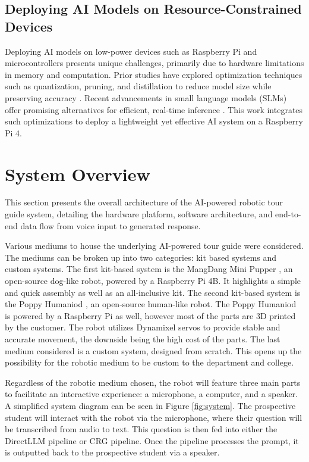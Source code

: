 \documentclass[conference]{IEEEtran}
\begin{document}
\subsection{Deploying AI Models on Resource-Constrained Devices}
Deploying AI models on low-power devices such as Raspberry Pi and microcontrollers presents unique challenges, primarily due to hardware limitations in memory and computation. 
Prior studies have explored optimization techniques such as quantization, pruning, and distillation to reduce model size while preserving accuracy \cite{b4}. 
Recent advancements in small language models (SLMs) offer promising alternatives for efficient, real-time inference \cite{b5}. 
This work integrates such optimizations to deploy a lightweight yet effective AI system on a Raspberry Pi 4.

\section{System Overview}
This section presents the overall architecture of the AI-powered robotic tour guide system, detailing the hardware platform,
software architecture, and end-to-end data flow from voice input to generated response.

Various mediums to house the underlying AI-powered tour guide were considered. The mediums can be broken up into two categories: kit based systems and custom systems.
The first kit-based system is the MangDang Mini Pupper \cite{b1}, an open-source dog-like robot, powered by a Raspberry Pi 4B. It highlights a simple and quick assembly as well as an all-inclusive kit. 
The second kit-based system is the Poppy Humaniod \cite{b6}, an open-source human-like robot. The Poppy Humaniod is powered by a Raspberry Pi as well, however most of the parts are 3D printed by the customer. The robot utilizes Dynamixel servos to provide stable and accurate movement, the downside being the high cost of the parts.
The last medium considered is a custom system, designed from scratch. This opens up the possibility for the robotic medium to be custom to the department and college. 

Regardless of the robotic medium chosen, the robot will feature three main parts to facilitate an interactive experience: a microphone, a computer, and a speaker. 
A simplified system diagram can be seen in Figure \ref{fig:system}. The prospective student will interact with the robot via the microphone, where their question will be transcribed from audio to text.
This question is then fed into either the DirectLLM pipeline or CRG pipeline. Once the pipeline processes the prompt, it is outputted back to the prospective student via a speaker.
\end{document}
